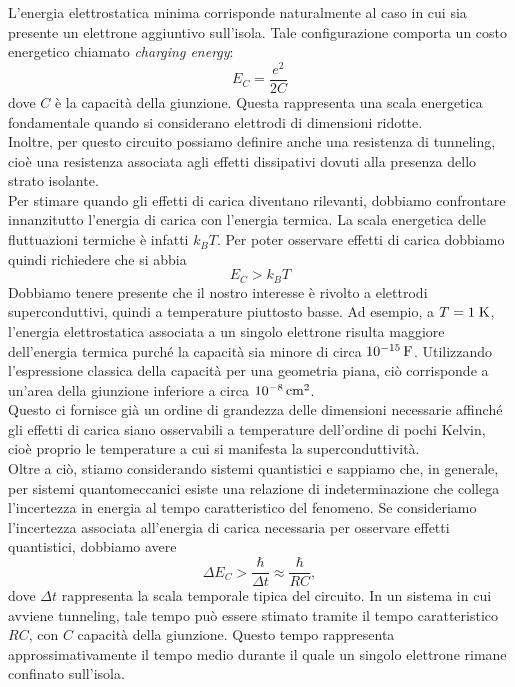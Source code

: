 L'energia elettrostatica minima corrisponde naturalmente al caso in cui sia presente un elettrone aggiuntivo sull'isola. Tale configurazione comporta un costo energetico chiamato \emph{charging energy}:
\begin{equation*}
    E_C
    =
    \frac{e^2}{2C}
\end{equation*}
dove $C$ è la capacità della giunzione. Questa rappresenta una scala energetica fondamentale quando si considerano elettrodi di dimensioni ridotte.\\
Inoltre, per questo circuito possiamo definire anche una resistenza di tunneling, cioè una resistenza associata agli effetti dissipativi dovuti alla presenza dello strato isolante.\\
Per stimare quando gli effetti di carica diventano rilevanti, dobbiamo confrontare innanzitutto l'energia di carica con l'energia termica. La scala energetica delle fluttuazioni termiche è infatti $k_B T$. Per poter osservare effetti di carica dobbiamo quindi richiedere che si abbia
\begin{equation*}
    E_C > k_B T
\end{equation*}
Dobbiamo tenere presente che il nostro interesse è rivolto a elettrodi superconduttivi, quindi a temperature piuttosto basse. Ad esempio, a $T=1\;\rm K$, l'energia elettrostatica associata a un singolo elettrone risulta maggiore dell'energia termica purché la capacità sia minore di circa $10^{-15}\,\rm F$. Utilizzando l'espressione classica della capacità per una geometria piana, ciò corrisponde a un'area della giunzione inferiore a circa $10^{-8}\,\rm cm^2$.\\
Questo ci fornisce già un ordine di grandezza delle dimensioni necessarie affinché gli effetti di carica siano osservabili a temperature dell'ordine di pochi Kelvin, cioè proprio le temperature a cui si manifesta la superconduttività.\\
Oltre a ciò, stiamo considerando sistemi quantistici e sappiamo che, in generale, per sistemi quantomeccanici esiste una relazione di indeterminazione che collega l'incertezza in energia al tempo caratteristico del fenomeno. Se consideriamo l'incertezza associata all'energia di carica necessaria per osservare effetti quantistici, dobbiamo avere
\begin{equation*}
    \Delta E_C
    >
    \frac{\hbar}{\Delta t}
    \approx
    \frac{\hbar}{RC},
\end{equation*}
dove $\Delta t$ rappresenta la scala temporale tipica del circuito. In un sistema in cui avviene tunneling, tale tempo può essere stimato tramite il tempo caratteristico $RC$, con $C$ capacità della giunzione. Questo tempo rappresenta approssimativamente il tempo medio durante il quale un singolo elettrone rimane confinato sull'isola.\\
